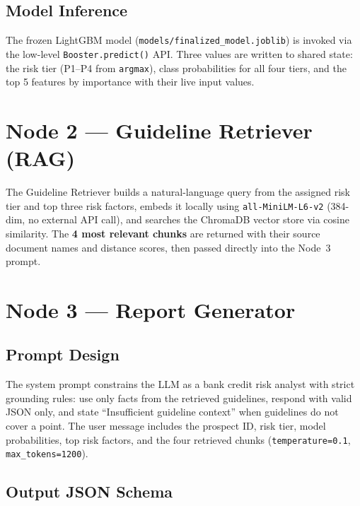\documentclass[11pt,a4paper]{article}
\begin{document}
\subsection{Model Inference}

The frozen LightGBM model (\texttt{models/finalized\_model.joblib}) is invoked via the low-level \texttt{Booster.predict()} API. Three values are written to shared state: the risk tier (P1--P4 from \texttt{argmax}), class probabilities for all four tiers, and the top 5 features by importance with their live input values.

\section{Node 2 --- Guideline Retriever (RAG)}

The Guideline Retriever builds a natural-language query from the assigned risk tier and top three risk factors, embeds it locally using \texttt{all-MiniLM-L6-v2} (384-dim, no external API call), and searches the ChromaDB vector store via cosine similarity. The \textbf{4 most relevant chunks} are returned with their source document names and distance scores, then passed directly into the Node~3 prompt.

\section{Node 3 --- Report Generator}

\subsection{Prompt Design}

The system prompt constrains the LLM as a bank credit risk analyst with strict grounding rules: use only facts from the retrieved guidelines, respond with valid JSON only, and state ``Insufficient guideline context'' when guidelines do not cover a point. The user message includes the prospect ID, risk tier, model probabilities, top risk factors, and the four retrieved chunks (\texttt{temperature=0.1}, \texttt{max\_tokens=1200}).

\subsection{Output JSON Schema}
\end{document}
